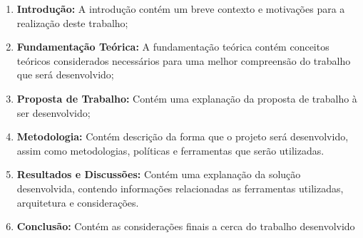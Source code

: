 \begin{enumerate}
    \item \textbf{Introdução:} A introdução contém um breve contexto e motivações para a realização deste trabalho;
    \item \textbf{Fundamentação Teórica:} A fundamentação teórica contém conceitos teóricos considerados necessários para uma melhor compreensão do trabalho que será desenvolvido;
    \item \textbf{Proposta de Trabalho:} Contém uma explanação da proposta de trabalho à ser desenvolvido;
    \item \textbf{Metodologia:} Contém descrição da forma que o projeto será desenvolvido, assim como metodologias, políticas e ferramentas que serão utilizadas.
    \item \textbf{Resultados e Discussões:} Contém uma explanação da solução desenvolvida, contendo informações relacionadas as ferramentas utilizadas, arquitetura e considerações.
    \item \textbf{Conclusão:} Contém as considerações finais a cerca do trabalho desenvolvido
\end{enumerate}
